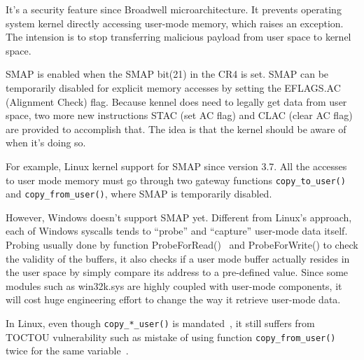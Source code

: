 It's a security feature since Broadwell microarchitecture. It prevents operating system kernel directly accessing user-mode memory, which raises an exception. The intension is to stop transferring malicious payload from user space to kernel space.

SMAP is enabled when the SMAP bit(21) in the CR4 is set. SMAP can be temporarily disabled for explicit memory accesses by setting the EFLAGS.AC (Alignment Check) flag. Because kennel does need to legally get data from user space, two more new instructions STAC (set AC flag) and CLAC (clear AC flag) are provided to accomplish that. The idea is that the kernel should be aware of when it's doing so. 

For example, Linux kernel support for SMAP since version 3.7. All the accesses to user mode memory must go through two gateway functions \texttt{copy\_to\_user()} and \texttt{copy\_from\_user()}, where SMAP is temporarily disabled.

However, Windows doesn't support SMAP yet. Different from Linux's approach, each of Windows syscalls tends to ``probe'' and ``capture'' user-mode data itself. Probing usually done by function ProbeForRead()~\cite{probeforread} and ProbeForWrite() to check the validity of the buffers, it also checks if a user mode buffer actually resides in the user space by simply compare its address to a pre-defined value. Since some modules such as win32k.sys are highly coupled with user-mode components, it will cost huge engineering effort to change the way it retrieve user-mode data.

In Linux, even though \texttt{copy\_*\_user()} is mandated~\cite{corbet2012linuxsmap}, it still suffers from TOCTOU vulnerability such as mistake of using function \texttt{copy\_from\_user()} twice for the same variable~\cite{double-fetch-linux}. 
